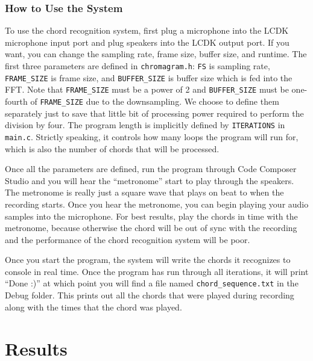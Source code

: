 \documentclass[journal]{IEEEtran}
\begin{document}
\subsubsection{How to Use the System}
To use the chord recognition system, first plug a microphone into the LCDK microphone input port and plug speakers into the LCDK output port.
If you want, you can change the sampling rate, frame size, buffer size, and runtime.
The first three parameters are defined in \texttt{chromagram.h}: \texttt{FS} is sampling rate, \texttt{FRAME\_SIZE} is frame size, and \texttt{BUFFER\_SIZE} is buffer size which is fed into the FFT.
Note that \texttt{FRAME\_SIZE} must be a power of 2 and \texttt{BUFFER\_SIZE} must be one-fourth of \texttt{FRAME\_SIZE} due to the downsampling.
We choose to define them separately just to save that little bit of processing power required to perform the division by four.
The program length is implicitly defined by \texttt{ITERATIONS} in \texttt{main.c}.
Strictly speaking, it controls how many loops the program will run for, which is also the number of chords that will be processed.

Once all the parameters are defined, run the program through Code Composer Studio and you will hear the “metronome” start to play through the speakers.
The metronome is really just a square wave that plays on beat to when the recording starts.
Once you hear the metronome, you can begin playing your audio samples into the microphone.
For best results, play the chords in time with the metronome, because otherwise the chord will be out of sync with the recording and the performance of the chord recognition system will be poor.

Once you start the program, the system will write the chords it recognizes to console in real time.
Once the program has run through all iterations, it will print ``Done :)'' at which point you will find a file named \texttt{chord\_sequence.txt} in the Debug folder.
This prints out all the chords that were played during recording along with the times that the chord was played.


\section{Results}
\end{document}

